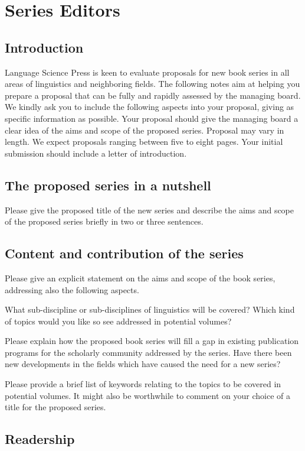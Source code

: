 \chapter{Series Editors}
\section{Introduction}
Language Science Press is keen to evaluate proposals for new book series in all areas
of linguistics and neighboring fields. The following notes aim at
helping you prepare a proposal that can be fully and rapidly assessed
by the managing board. We kindly ask you to include the following
aspects into your proposal, giving as specific information as possible.
Your proposal should give the managing board a clear idea of the aims
and scope of the proposed series. Proposal may vary in length. We
expect proposals ranging between five to eight pages. Your initial
submission should include a letter of introduction.


\section{The proposed series in a nutshell}

Please give the proposed title of the new series and describe the
aims and scope of the proposed series briefly in two or three sentences.


\section{Content and contribution of the series}

Please give an explicit statement on the aims and scope of the book
series, addressing also the following aspects.

What sub-discipline or sub-disciplines of linguistics will be covered?
Which kind of topics would you like so see addressed in potential
volumes?

Please explain how the proposed book series will fill a gap in existing
publication programs for the scholarly community addressed by the
series. Have there been new developments in the fields which have
caused the need for a new series?

Please provide a brief list of keywords relating to the topics to
be covered in potential volumes. It might also be worthwhile to comment
on your choice of a title for the proposed series.


\section{Readership}


